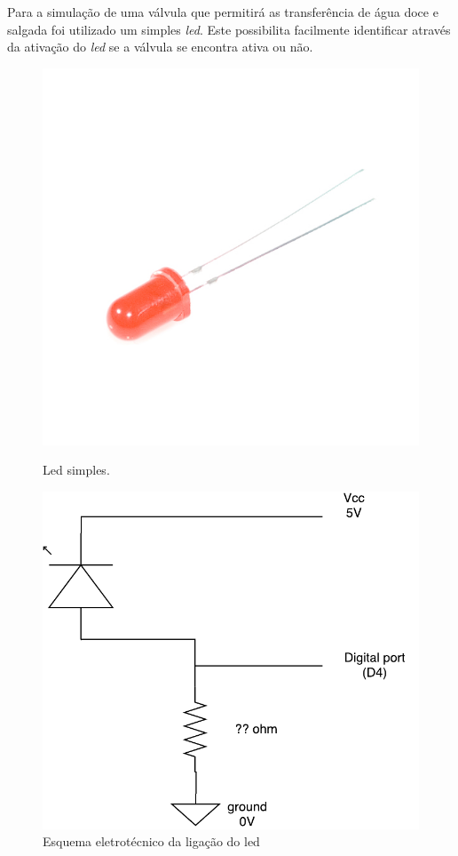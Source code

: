 Para a simulação de uma válvula que permitirá as transferência de água doce e salgada foi utilizado um simples \textit{led}. Este possibilita facilmente identificar através da ativação do \textit{led} se a válvula se encontra ativa ou não. 


\begin{figure}[h]
	\centering
	\begin{minipage}[b]{0.4\textwidth}
		\includegraphics[width=\textwidth]{img/hardware/led.jpg}
		\caption{Led simples.}
	\end{minipage}
	\hfill
	\begin{minipage}[b]{0.4\textwidth}
		\includegraphics[width=\textwidth]{img/hardware/led_esquema.pdf}
		\caption{Esquema eletrotécnico da ligação do led}
	\end{minipage}
\end{figure}




